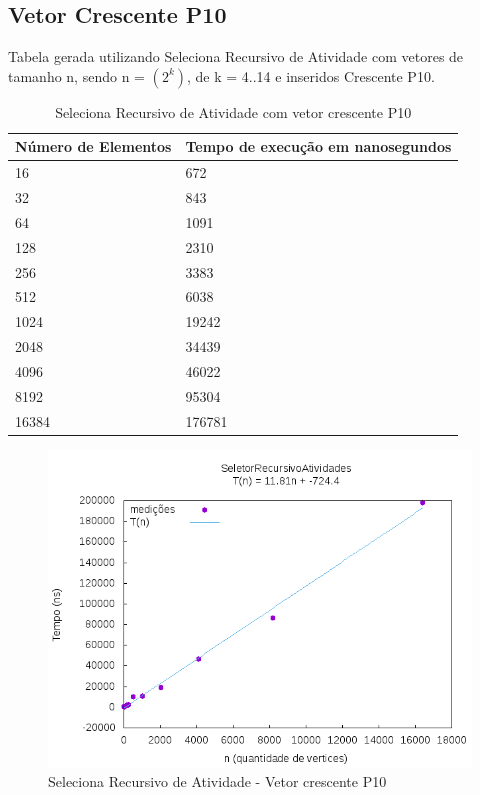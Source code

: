 \documentclass[12pt,a4paper,twoside]{report}
\begin{document}
\subsection{Vetor Crescente P10}
Tabela gerada utilizando Seleciona Recursivo de Atividade  com vetores de tamanho n, sendo n = $(2^k)$, de k = 4..14 e inseridos Crescente P10.
\begin{table}[H]
\centering
\caption{Seleciona Recursivo de Atividade com vetor crescente P10}
\label{my-label}
\begin{tabular}{|l|l|}
\hline
\multicolumn{1}{|c|}{\textbf{Número de Elementos}} & \multicolumn{1}{c|}{\textbf{Tempo de execução em nanosegundos}} \\ \hline
16 & 672 \\ \hline
32 & 843 \\ \hline
64 & 1091 \\ \hline
128 & 2310 \\ \hline
256 & 3383 \\ \hline
512 & 6038 \\ \hline
1024 & 19242 \\ \hline
2048 & 34439 \\ \hline
4096 & 46022 \\ \hline
8192 & 95304 \\ \hline
16384 & 176781 \\ \hline

\end{tabular}
\end{table}

\begin{figure}[H]
    \centering
    \includegraphics[width=0.7\linewidth]{graficos/SeletorRecursivoAtividades/Crescente P10/SelecionaAleatorizado.png}
  \caption{Seleciona Recursivo de Atividade - Vetor crescente P10}
\end{figure}
\end{document}
